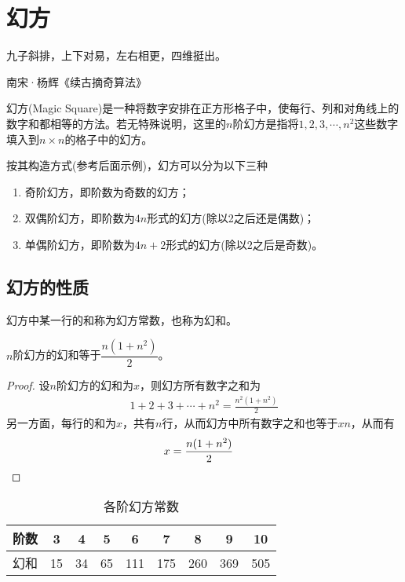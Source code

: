 \chapter{幻方}
\label{chap:magic-square}

\epigraph{九子斜排，上下对易，左右相更，四维挺出。}{南宋·杨辉《续古摘奇算法》}

幻方(Magic Square)是一种将数字安排在正方形格子中，使每行、列和对角线上的数字和都相等的方法。若无特殊说明，这里的$n$阶幻方是指将$1,2,3,\cdots,n^2$这些数字填入到$n\times n$的格子中的幻方。

按其构造方式(参考后面示例)，幻方可以分为以下三种
\begin{enumerate}
\item 奇阶幻方，即阶数为奇数的幻方；
\item 双偶阶幻方，即阶数为$4n$形式的幻方(除以2之后还是偶数)；
\item 单偶阶幻方，即阶数为$4n+2$形式的幻方(除以2之后是奇数)。
\end{enumerate}

\section{幻方的性质}
\label{sec:magic-square-properties}

\begin{definition}[幻方常数]
  幻方中某一行的和称为幻方常数，也称为幻和。
\end{definition}

\begin{theorem}
  $n$阶幻方的幻和等于$\dfrac{n(1+n^2)}2$。
\end{theorem}
\begin{proof}
  设$n$阶幻方的幻和为$x$，则幻方所有数字之和为
  \begin{align*}
    1+2+3+\cdots+n^2=\frac{n^2(1+n^2)}{2}
  \end{align*}
  另一方面，每行的和为$x$，共有$n$行，从而幻方中所有数字之和也等于$xn$，从而有
  \begin{align*}
    x=\frac{n(1+n^2)}{2}&\qedhere
  \end{align*}
\end{proof}

\begin{table}[htbp]
  \centering
  \begin{tabular}{c|cccccccc}
    \toprule[2pt]
    阶数 & 3  & 4  & 5  & 6   & 7   & 8   & 9   & 10 \\\hline
    幻和 & 15 & 34 & 65 & 111 & 175 & 260 & 369 & 505\\
    \bottomrule[2pt]
  \end{tabular}
  \caption{各阶幻方常数}
  \label{tab:constant-of-some-magic-squares}
\end{table}

